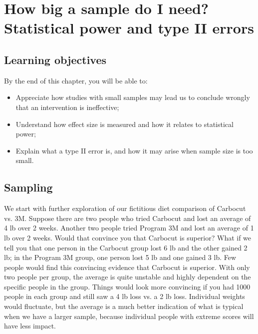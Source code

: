 \documentclass{krantz}
\begin{document}
\hypertarget{power}{%
\chapter{How big a sample do I need? Statistical power and type II errors}\label{power}}

\hypertarget{learning-objectives-11}{%
\section{Learning objectives}\label{learning-objectives-11}}

By the end of this chapter, you will be able to:

\begin{itemize}
\item
  Appreciate how studies with small samples may lead us to conclude wrongly that an intervention is ineffective;
\item
  Understand how effect size is measured and how it relates to statistical power;
\item
  Explain what a type II error is, and how it may arise when sample size is too small.
\end{itemize}

\hypertarget{sampling]}{%
\section{Sampling}\label{sampling}}

We start with further exploration of our fictitious diet comparison of Carbocut vs. 3M. Suppose there are two people who tried Carbocut and lost an average of 4 lb over 2 weeks. Another two people tried Program 3M and lost an average of 1 lb over 2 weeks. Would that convince you that Carbocut is superior? What if we tell you that one person in the Carbocut group lost 6 lb and the other gained 2 lb; in the Program 3M group, one person lost 5 lb and one gained 3 lb. Few people would find this convincing evidence that Carbocut is superior. With only two people per group, the average is quite unstable and highly dependent on the specific people in the group. Things would look more convincing if you had 1000 people in each group and still saw a 4 lb loss vs. a 2 lb loss. Individual weights would fluctuate, but the average is a much better indication of what is typical when we have a larger sample, because individual people with extreme scores will have less impact.
\end{document}
